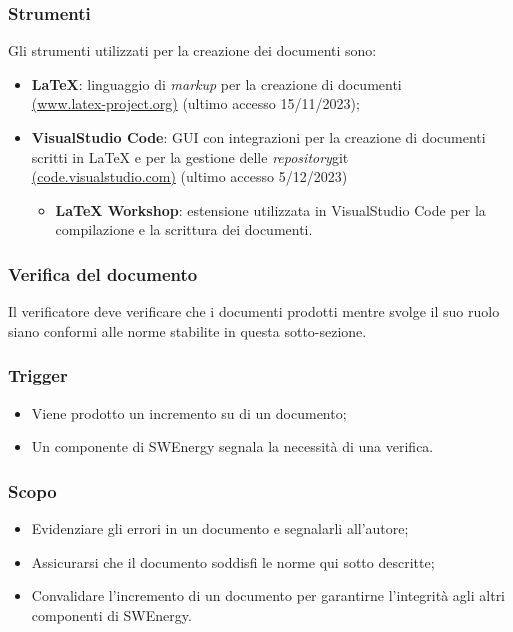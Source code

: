 \subsubsection*{Strumenti}
Gli strumenti utilizzati per la creazione dei documenti sono:
\begin{itemize}
	\item \textbf{LaTeX}: linguaggio di \textit{markup} per la creazione di documenti \\ 
		\href{https://www.latex-project.org/}{(www.latex-project.org)} (ultimo accesso 15/11/2023);
	\item \textbf{VisualStudio Code}: GUI con integrazioni per la creazione di documenti scritti in LaTeX e per la gestione delle \textit{repository}\g git\g \\
		\href{https://code.visualstudio.com/}{(code.visualstudio.com)} (ultimo accesso 5/12/2023)
		\begin{itemize}
			\item \textbf{LaTeX Workshop}: estensione utilizzata in VisualStudio Code per la compilazione e la scrittura dei documenti.
		\end{itemize}
\end{itemize}





\subsubsection{Verifica del documento}
\label{verifica-documento}
Il verificatore deve verificare che i documenti prodotti mentre svolge il suo ruolo siano conformi alle norme stabilite in questa sotto-sezione.

\subsubsection*{Trigger}
\begin{itemize}
	\item Viene prodotto un incremento su di un documento;
	\item Un componente di SWEnergy segnala la necessità di una verifica.
\end{itemize}

\subsubsection*{Scopo}
\begin{itemize}
	\item Evidenziare gli errori in un documento e segnalarli all'autore;
	\item Assicurarsi che il documento soddisfi le norme qui sotto descritte;
	\item Convalidare l'incremento di un documento per garantirne l'integrità agli altri componenti di SWEnergy.
\end{itemize}

